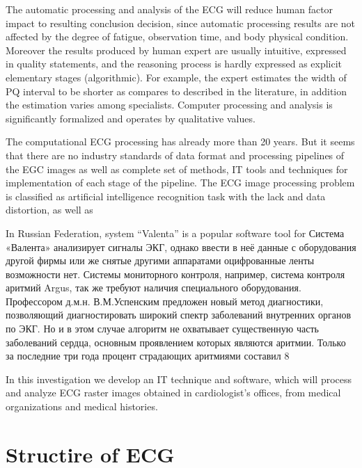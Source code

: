 \documentclass[runningheads]{AIIT}
\begin{document}
The automatic processing and analysis of the ECG will reduce human factor impact to resulting conclusion decision, since automatic processing results are not affected by the degree of fatigue, observation time, and body physical condition.  Moreover the results produced by human expert are usually intuitive, expressed in quality statements, and the reasoning process is hardly expressed as explicit elementary stages (algorithmic).  For example, the expert estimates the width of PQ interval to be shorter as compares to described in the literature, in addition the estimation varies among specialists.  Computer processing and analysis is significantly formalized and operates by qualitative values.

The computational ECG processing has already more than 20 years.  But it seems that there are no industry standards of data format and processing pipelines of the EGC images as well as complete set of methods, IT tools and techniques for implementation of each stage of the pipeline.  The ECG image processing problem is classified as artificial intelligence recognition task with the lack and data distortion, as well as

In Russian Federation, system ``Valenta'' is a popular software tool for
Система «Валента» анализирует сигналы ЭКГ, однако ввести в неё данные с оборудования другой фирмы или же снятые другими аппаратами оцифрованные ленты возможности нет. Системы мониторного контроля, например, система контроля аритмий Argus, так же требуют наличия специального оборудования. Профессором д.м.н. В.М.Успенским предложен новый метод диагностики, позволяющий диагностировать широкий спектр заболеваний внутренних органов по ЭКГ.  Но и в этом случае алгоритм не охватывает существенную часть заболеваний сердца, основным проявлением которых являются аритмии. Только за последние три года процент страдающих аритмиями составил 8%

In this investigation we develop an IT technique and software, which will process and analyze ECG raster images obtained in cardiologist's offices, from medical organizations and medical histories.


\section{Structire of ECG}
\label{sec:structire-ecg}
\end{document}
